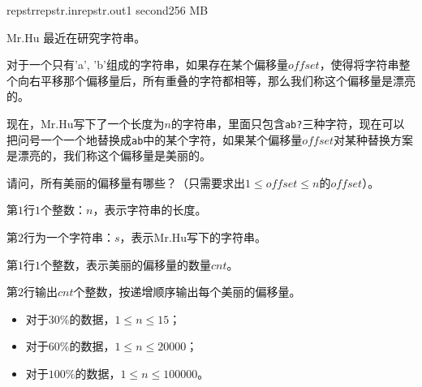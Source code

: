 \documentclass[11pt,a4paper,oneside]{article}
\begin{document}
\begin{problem}{repstr}{repstr.in}{repstr.out}{1 second}{256 MB}
	
	Mr.Hu 最近在研究字符串。
	
	对于一个只有'a', 'b'组成的字符串，如果存在某个偏移量$offset$，使得将字符串整个向右平移那个偏移量后，所有重叠的字符都相等，那么我们称这个偏移量是漂亮的。
	
	现在，Mr.Hu写下了一个长度为$n$的字符串，里面只包含\verb|ab?|三种字符，现在可以把问号一个一个地替换成\verb|ab|中的某个字符，如果某个偏移量$offset$对某种替换方案是漂亮的，我们称这个偏移量是美丽的。
	
	请问，所有美丽的偏移量有哪些？（只需要求出$1 \leq offset \leq n$的$offset$）。
	
	\InputFile
	
	第$1$行$1$个整数：$n$，表示字符串的长度。
	
	第$2$行为一个字符串：$s$，表示Mr.Hu写下的字符串。
	
	\OutputFile
	
	第$1$行$1$个整数，表示美丽的偏移量的数量$cnt$。
	
	第$2$行输出$cnt$个整数，按递增顺序输出每个美丽的偏移量。
	
	\Example
	
	\begin{example}
	\end{example}

	\begin{example}
		\exmp{
			4
			?ab?
		}{
			3
			2 3 4
		}%
	\end{example}

	\Note
	\begin{itemize}
		\item 对于$30\%$的数据，$1 \leq n \leq 15$；
		\item 对于$60\%$的数据，$1 \leq n \leq 20000$；
		\item 对于$100\%$的数据，$1 \leq n \leq 100000$。
	\end{itemize}

\end{problem}
\end{document}
